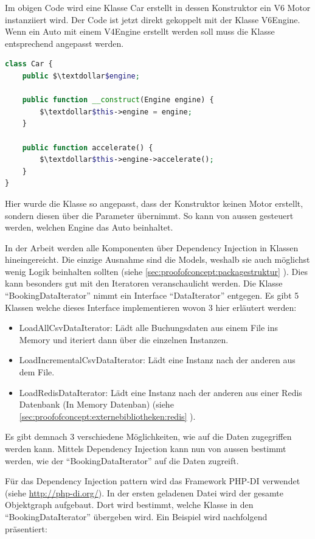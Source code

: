 Im obigen Code wird eine Klasse Car erstellt in dessen Konstruktor ein V6 Motor instanziiert  wird. Der Code ist jetzt direkt gekoppelt mit der Klasse V6Engine. Wenn ein Auto mit einem V4Engine erstellt werden soll muss die Klasse entsprechend angepasst werden. 


\begin{lstlisting}[language=php]
class Car {
	public $\textdollar$engine;
	
	public function __construct(Engine engine) {
		$\textdollar$this->engine = engine;
	}
	
	public function accelerate() {
		$\textdollar$this->engine->accelerate();
	}
}
\end{lstlisting}

Hier wurde die Klasse so angepasst, dass der Konstruktor keinen Motor erstellt, sondern diesen über die Parameter übernimmt. So kann von aussen gesteuert werden, welchen Engine das Auto beinhaltet. 

In der Arbeit werden alle Komponenten über Dependency Injection in Klassen hineingereicht. Die einzige Ausnahme sind die Models, weshalb sie auch möglichst wenig Logik beinhalten sollten (siehe \cref{sec:proofofconcept:packagestruktur} ). Dies kann besonders gut mit den Iteratoren veranschaulicht werden. Die Klasse "`BookingDataIterator"' nimmt ein Interface "`DataIterator"' entgegen. Es gibt 5 Klassen welche dieses Interface implementieren wovon 3 hier erläutert werden:
\begin{itemize}
	\item LoadAllCsvDataIterator: Lädt alle Buchungsdaten aus einem File ins Memory und iteriert dann über die einzelnen Instanzen.
	\item LoadIncrementalCsvDataIterator: Lädt eine Instanz nach der anderen aus dem File.
	\item LoadRedisDataIterator: Lädt eine Instanz nach der anderen aus einer Redis Datenbank (In Memory Datenban) (siehe \cref{sec:proofofconcept:externebibliotheken:redis} ).
\end{itemize}

Es gibt demnach 3 verschiedene Möglichkeiten, wie auf die Daten zugegriffen werden kann. Mittels Dependency Injection kann nun von aussen bestimmt werden, wie der "`BookingDataIterator"' auf die Daten zugreift.

Für das Dependency Injection \gls{pattern}
 wird das Framework PHP-DI verwendet (siehe \url{http://php-di.org/}). In der ersten geladenen Datei wird der gesamte Objektgraph aufgebaut. Dort wird bestimmt, welche Klasse in den "`BookingDataIterator"' übergeben wird. Ein Beispiel wird nachfolgend präsentiert:
 
